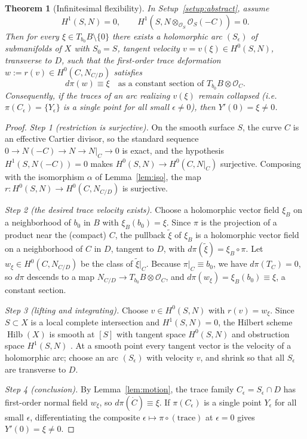 \documentclass[11pt]{amsart}
\DeclareMathOperator{\Hilb}{Hilb}
\theoremstyle{plain}
\newtheorem{theorem}{Theorem}[section]
\theoremstyle{definition}
\theoremstyle{remark}
\begin{document}
\begin{theorem}[Infinitesimal flexibility]\label{thm:inflect}
In Setup~\ref{setup:abstract}, assume
\[
H^1(S,N)=0,\qquad H^1(S,N\otimes_{\mathcal O_S}\mathcal O_S(-C))=0 .
\]
Then for every $\xi\in T_{b_0}B\setminus\{0\}$ there exists a holomorphic arc
$(S_\epsilon)$ of submanifolds of $X$ with $S_0=S$, tangent velocity $v=v(\xi)\in
H^0(S,N)$, transverse to $D$, such that the first-order trace deformation
$w:=r(v)\in H^0(C,N_{C/D})$ satisfies
\[
d\pi(w)\equiv \xi\quad\text{as a constant section of } T_{b_0}B\otimes \mathcal O_C.
\]
Consequently, if the traces of an arc realizing $v(\xi)$ remain collapsed
(i.e.\ $\pi(C_\epsilon)=\{Y_\epsilon\}$ is a single point for all small
$\epsilon\ne0$), then $Y'(0)=\xi\ne 0$.
\end{theorem}

\begin{proof}
\emph{Step 1 (restriction is surjective).} On the smooth surface $S$, the curve $C$
is an effective Cartier divisor, so the standard sequence
$0\to N(-C)\to N\to N|_C\to0$ is exact, and the hypothesis
$H^1(S,N(-C))=0$ makes $H^0(S,N)\to H^0(C,N|_C)$ surjective. Composing with the
isomorphism $\alpha$ of Lemma~\ref{lem:iso}, the map
$r:H^0(S,N)\to H^0(C,N_{C/D})$ is surjective.

\emph{Step 2 (the desired trace velocity exists).} Choose a holomorphic vector field
$\xi_B$ on a neighborhood of $b_0$ in $B$ with $\xi_B(b_0)=\xi$. Since $\pi$ is the
projection of a product near the (compact) $C$, the pullback $\tilde\xi$ of $\xi_B$
is a holomorphic vector field on a neighborhood of $C$ in $D$, tangent to $D$, with
$d\pi(\tilde\xi)=\xi_B\circ\pi$. Let $w_\xi\in H^0(C,N_{C/D})$ be the class of
$\tilde\xi|_C$. Because $\pi|_C\equiv b_0$, we have $d\pi(T_C)=0$, so $d\pi$
descends to a map $N_{C/D}\to T_{b_0}B\otimes\mathcal O_C$, and
$d\pi(w_\xi)=\xi_B(b_0)\equiv\xi$, a constant section.

\emph{Step 3 (lifting and integrating).} Choose $v\in H^0(S,N)$ with $r(v)=w_\xi$.
Since $S\subset X$ is a local complete intersection and $H^1(S,N)=0$, the Hilbert
scheme $\Hilb(X)$ is smooth at $[S]$ with tangent space $H^0(S,N)$ and obstruction
space $H^1(S,N)$ \cite{Sernesi, HartshorneDef, Nitsure}. At a smooth point every
tangent vector is the velocity of a holomorphic arc; choose an arc $(S_\epsilon)$
with velocity $v$, and shrink so that all $S_\epsilon$ are transverse to $D$.

\emph{Step 4 (conclusion).} By Lemma~\ref{lem:motion}, the trace family
$C_\epsilon=S_\epsilon\cap D$ has first-order normal field $w_\xi$, so
$d\pi(\dot C)\equiv\xi$. If $\pi(C_\epsilon)$ is a single point $Y_\epsilon$ for all
small $\epsilon$, differentiating the composite
$\epsilon\mapsto \pi\circ(\text{trace})$ at $\epsilon=0$ gives
$Y'(0)=\xi\ne 0$.
\end{proof}
\end{document}
